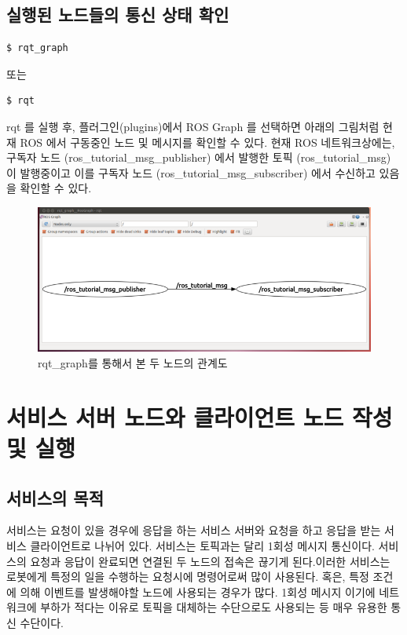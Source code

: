 \subsection{실행된 노드들의 통신 상태 확인}

\begin{lstlisting}[language=ROS]
$ rqt_graph
\end{lstlisting}
또는

\begin{lstlisting}[language=ROS]
$ rqt
\end{lstlisting}

rqt 를 실행 후, 플러그인(plugins)에서 ROS Graph 를 선택하면 아래의 그림처럼 현재 ROS 에서 구동중인 노드 및 메시지를 확인할 수 있다. 현재 ROS 네트워크상에는, 구독자 노드 (ros\_tutorial\_msg\_publisher) 에서 발행한 토픽 (ros\_tutorial\_msg) 이 발행중이고 이를 구독자 노드 (ros\_tutorial\_msg\_subscriber) 에서 수신하고 있음을 확인할 수 있다.

\begin{figure}[h]
\centering\includegraphics[width=0.5\columnwidth]{pictures/chapter7/rqt_graph_oroca_ros_tutorials.png}
\caption{rqt\_graph를 통해서 본 두 노드의 관계도}
\end{figure}

\section{서비스 서버 노드와 클라이언트 노드 작성 및 실행}

\subsection{서비스의 목적}

서비스는 요청이 있을 경우에 응답을 하는 서비스 서버와 요청을 하고 응답을 받는 서비스 클라이언트로 나뉘어 있다. 서비스는 토픽과는 달리 1회성 메시지 통신이다. 서비스의 요청과 응답이 완료되면 연결된 두 노드의 접속은 끊기게 된다.이러한 서비스는 로봇에게 특정의 일을 수행하는 요청시에 명령어로써 많이 사용된다. 혹은, 특정 조건에 의해 이벤트를 발생해야할 노드에 사용되는 경우가 많다. 1회성 메시지 이기에 네트워크에 부하가 적다는 이유로 토픽을 대체하는 수단으로도 사용되는 등 매우 유용한 통신 수단이다.

